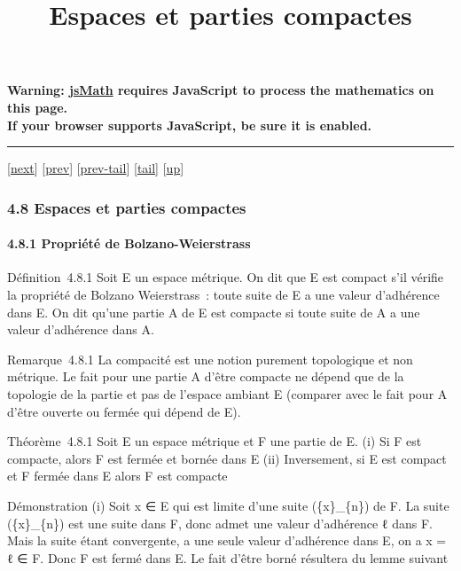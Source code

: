 \documentclass[]{article}
\title{Espaces et parties compactes}
\author{}
\date{}
\begin{document}
\maketitle

\textbf{Warning: \href{http://www.math.union.edu/locate/jsMath}{jsMath}
requires JavaScript to process the mathematics on this page.\\ If your
browser supports JavaScript, be sure it is enabled.}

\begin{center}\rule{3in}{0.4pt}\end{center}

{[}\href{coursse26.html}{next}{]} {[}\href{coursse24.html}{prev}{]}
{[}\href{coursse24.html\#tailcoursse24.html}{prev-tail}{]}
{[}\hyperref[tailcoursse25.html]{tail}{]}
{[}\href{coursch5.html\#coursse25.html}{up}{]}

\subsubsection{4.8 Espaces et parties compactes}

\paragraph{4.8.1 Propriété de Bolzano-Weierstrass}

Définition~4.8.1 Soit E un espace métrique. On dit que E est compact
s'il vérifie la propriété de Bolzano Weierstrass~: toute suite de E a
une valeur d'adhérence dans E. On dit qu'une partie A de E est compacte
si toute suite de A a une valeur d'adhérence dans A.

Remarque~4.8.1 La compacité est une notion purement topologique et non
métrique. Le fait pour une partie A d'être compacte ne dépend que de la
topologie de la partie et pas de l'espace ambiant E (comparer avec le
fait pour A d'être ouverte ou fermée qui dépend de E).

Théorème~4.8.1 Soit E un espace métrique et F une partie de E. (i) Si F
est compacte, alors F est fermée et bornée dans E (ii) Inversement, si E
est compact et F fermée dans E alors F est compacte

Démonstration (i) Soit x ∈ E qui est limite d'une suite (\{x\}\_\{n\})
de F. La suite (\{x\}\_\{n\}) est une suite dans F, donc admet une
valeur d'adhérence ℓ dans F. Mais la suite étant convergente, a une
seule valeur d'adhérence dans E, on a x = ℓ ∈ F. Donc F est fermé dans
E. Le fait d'être borné résultera du lemme suivant
\end{document}
